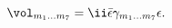 \begin{equation}
   \vol_{m_1\dots m_7} = 
      \ii \bar{\epsilon} \gamma_{m_1\dots m_7} \epsilon .
\end{equation}

